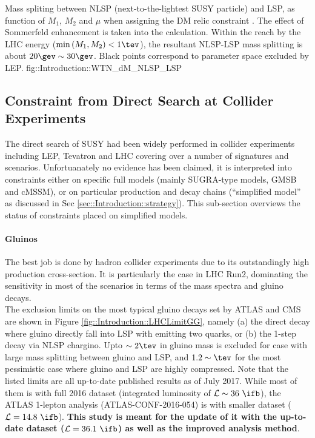 {Mass spliting between NLSP (next-to-the-lightest SUSY particle) and LSP, as function of $M_1$, $M_2$ and $\mu$ when assigning the DM relic constraint \cite{Bramante2016}. The effect of Sommerfeld enhancement is taken into the calculation. Within the reach by the LHC energy ($\min{(M_1,M_2)} <1\tev$), the resultant NLSP-LSP mass splitting is about $20\gev\sim30\gev$. Black points correspond to parameter space excluded by LEP.}
{fig::Introduction::WTN_dM_NLSP_LSP}

			

\clearpage
\subsection{Constraint from Direct Search at Collider Experiments}  \label{sec::Introduction::ExpConstColliders}
The direct search of SUSY had been widely performed in collider experiments including LEP, Tevatron and LHC covering over a number of signatures and scenarios. 
Unfortuanately no evidence has been claimed, it is interpreted into constraints either on specific full models (mainly SUGRA-type models, GMSB and cMSSM), or on particular production and decay chains (``simplified model'' as discussed in Sec \ref{sec::Introduction::strategy}).
This sub-section overviews the status of constraints placed on simplified models.

\paragraph{Gluinos}
The best job is done by hadron collider experiments due to its outstandingly high production cross-section.
It is particularly the case in LHC Run2, dominating the sensitivity in most of the scenarios in terms of the mass spectra and gluino decays. \\

The exclusion limits on the most typical gluino decays set by ATLAS and CMS are shown in Figure \ref{fig::Introduction::LHCLimitGG}, namely (a) the direct decay where gluino directly fall into LSP with emitting two quarks, or (b) the 1-step decay via NLSP chargino. Upto $\sim 2\tev$ in gluino mass is excluded for case with large mass splitting between gluino and LSP, and $1.2 \sim \tev$ for the most pessimistic case where gluino and LSP are highly compressed. Note that the listed limits are all up-to-date published results as of July 2017. While most of them is with full 2016 dataset (integrated luminosity of $\mathcal{L} \sim 36\,\,\ifb$), the ATLAS 1-lepton analysis (ATLAS-CONF-2016-054) is with smaller dataset ($\mathcal{L}=14.8\,\,\ifb$). \textbf{This study is meant for the update of it with the up-to-date dataset ($\mathcal{L}=36.1\,\,\ifb$) as well as the improved analysis method}.  \\

